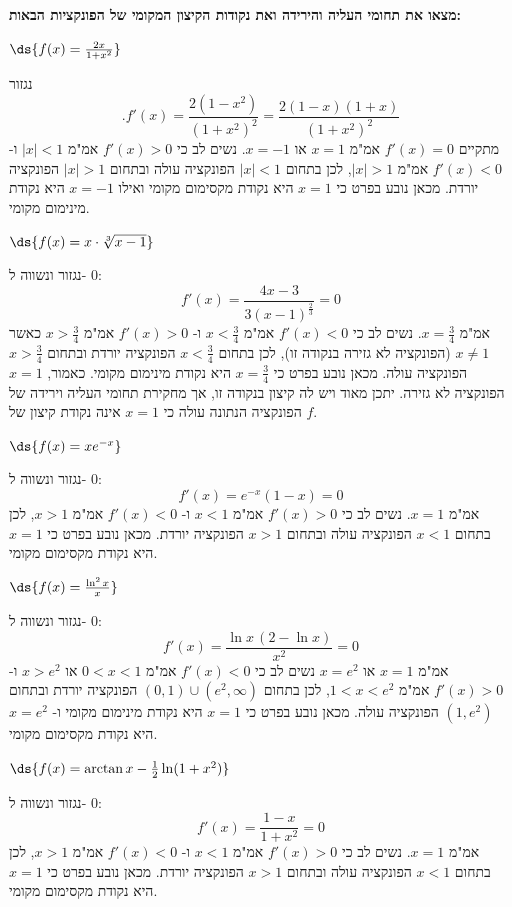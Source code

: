 \textbf{מצאו את תחומי העליה והירידה ואת נקודות הקיצון המקומי של הפונקציות הבאות:}
\bE{}
\item $\ds{ f(x) = \frac{2x}{1 + x^2}} $
\begin{solbox}
נגזור
$$.f'(x)=\frac{2(1-x^2)}{(1+x^2)^2}=\frac{2(1-x)(1+x)}{(1+x^2)^2}$$
מתקיים
$f'(x)=0$
אמ"מ
$x=1$
או
$x=-1$.
נשים לב כי
$f'(x)>0$
אמ"מ
$|x|<1$
ו-
$f'(x)<0$
אמ"מ
$|x|>1$,
לכן בתחום
$|x|<1$
הפונקציה עולה ובתחום
$|x|>1$
הפונקציה יורדת.
מכאן נובע בפרט כי
$x=1$
היא נקודת מקסימום מקומי ואילו
$x=-1$
היא נקודת מינימום מקומי.
\end{solbox}
\item $\ds{f(x) = x \cdot \sqrt[3]{x - 1}}$
\begin{solbox}
נגזור ונשווה ל-
$0$:
$$f'(x)=\frac{4x-3}{3(x-1)^{\frac{2}{3}}}=0$$
אמ"מ
$x=\frac{3}{4}$.
נשים לב כי
$f'(x)<0$
אמ"מ
$x<\frac{3}{4}$
ו-
$f'(x)>0$
אמ"מ
$x>\frac{3}{4}$
כאשר
$x\neq 1$
(הפונקציה לא גזירה בנקודה זו),
לכן בתחום
$x<\frac{3}{4}$
הפונקציה יורדת ובתחום
$x>\frac{3}{4}$
הפונקציה עולה.
מכאן נובע בפרט כי
$x=\frac{3}{4}$
היא נקודת מינימום מקומי.
כאמור,
$x=1$
הפונקציה לא גזירה. יתכן מאוד ויש לה קיצון בנקודה זו, אך מחקירת תחומי העליה וירידה של הפונקציה הנתונה עולה כי
$x=1$
אינה נקודת קיצון של
$f$.
\end{solbox}
\item $\ds{f(x) = x e^{-x}}$
\begin{solbox}
נגזור ונשווה ל-
$0$:
$$f'(x)=e^{-x}(1-x)=0$$
אמ"מ
$x=1$.
נשים לב כי
$f'(x)>0$
אמ"מ
$x<1$
ו-
$f'(x)<0$
אמ"מ
$x>1$,
לכן בתחום
$x<1$
הפונקציה עולה ובתחום
$x>1$
הפונקציה יורדת.
מכאן נובע בפרט כי
$x=1$
היא נקודת מקסימום מקומי.
\end{solbox}

\item $\ds{f(x) = \frac{\ln^2{x}}{x}}$
\begin{solbox}
נגזור ונשווה ל-
$0$:
$$f'(x)=\frac{\ln x\,(2-\ln x)}{x^2}=0$$
אמ"מ
$x=1$
או
$x=e^2$
נשים לב כי
$f'(x)<0$
אמ"מ
$0<x<1$
או
$x>e^2$
ו-
$f'(x)>0$
אמ"מ
$1<x<e^2$,
לכן בתחום
$(0,1)\cup(e^2,\infty)$
הפונקציה יורדת ובתחום
$(1,e^2)$
הפונקציה עולה.
מכאן נובע בפרט כי
$x=1$
היא נקודת מינימום מקומי
ו-
$x=e^2$
היא נקודת מקסימום מקומי.
\end{solbox}
\item $\ds{f(x) = \arctan{x} - \frac{1}{2} \ln(1 + x^2)}$
\begin{solbox}
נגזור ונשווה ל-
$0$:
$$f'(x)=\frac{1-x}{1+x^2}=0$$
אמ"מ
$x=1$.
נשים לב כי
$f'(x)>0$
אמ"מ
$x<1$
ו-
$f'(x)<0$
אמ"מ
$x>1$,
לכן בתחום
$x<1$
הפונקציה עולה ובתחום
$x>1$
הפונקציה יורדת.
מכאן נובע בפרט כי
$x=1$
היא נקודת מקסימום מקומי.
\end{solbox}

